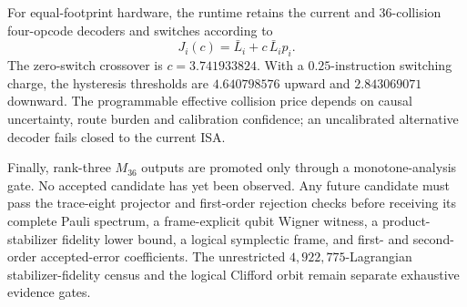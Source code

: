 For equal-footprint hardware, the runtime retains the current and $36$-collision
four-opcode decoders and switches according to
\[
J_i(c)=\bar L_i+c\,\bar L_i p_i.
\]
The zero-switch crossover is $c=3.741933824$. With a $0.25$-instruction switching charge,
the hysteresis thresholds are $4.640798576$ upward and $2.843069071$ downward. The
programmable effective collision price depends on causal uncertainty, route burden and
calibration confidence; an uncalibrated alternative decoder fails closed to the current
ISA.

Finally, rank-three $M_{36}$ outputs are promoted only through a monotone-analysis gate.
No accepted candidate has yet been observed. Any future candidate must pass the trace-eight
projector and first-order rejection checks before receiving its complete Pauli spectrum,
a frame-explicit qubit Wigner witness, a product-stabilizer fidelity lower bound, a logical
symplectic frame, and first- and second-order accepted-error coefficients. The unrestricted
$4{,}922{,}775$-Lagrangian stabilizer-fidelity census and the logical Clifford orbit remain
separate exhaustive evidence gates.
